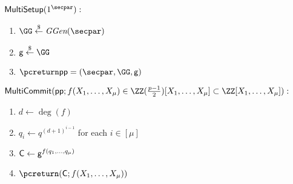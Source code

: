  \begin{mdframed}[userdefinedwidth=\textwidth]
\begin{minipage}{\textwidth}
	\begin{flushleft}
	$\pro{MultiSetup}(1^\secpar):$
		\begin{enumerate}[nolistsep]
			\item $ \GG \sample \ggen(\secpar)$
			\item $ \gr{g} \sample \GG$
			\item $\pcreturn \params = (\secpar,\GG,\gr{g})$
		\end{enumerate}
	$\pro{MultiCommit}(\params;f(X_1,\dots,X_\mu) \in \ZZ(\frac{p-1}{2})[X_1, \ldots, X_\mu]\subset \ZZ[X_1, \ldots, X_\mu]):$ 		\begin{enumerate}[nolistsep]
			\item $d\gets \deg(f)$
			\item $q_i\gets q^{(d+1)^{i-1}}$ for each $i\in [\mu]$
			\item $\mathsf{C} \gets \mathsf{g}^{f(q_1,\dots,q_\mu)}$
			\item $\pcreturn (\gr{C};f(X_1,\dots,X_\mu))$
		\end{enumerate}
			\end{flushleft}
\end{minipage}
\end{mdframed}
